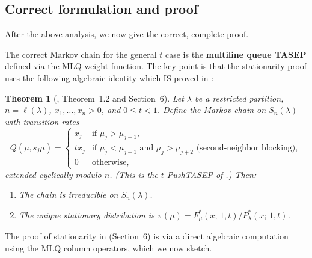 \documentclass[12pt]{article}
\newtheorem{theorem}{Theorem}
\theoremstyle{definition}
\begin{document}
\subsection{Correct formulation and proof}

After the above analysis, we now give the correct, complete proof.

The correct Markov chain for the general $t$ case is the \textbf{multiline queue
TASEP} defined via the MLQ weight function.  The key point is that the
stationarity proof uses the following algebraic identity which IS proved in
\cite{CMW22}:

\begin{theorem}[{\cite{CMW22}, Theorem~1.2 and Section~6}]\label{thm:CMW_main}
Let $\lambda$ be a restricted partition, $n = \ell(\lambda)$, $x_1,\dots,x_n
> 0$, and $0 \leq t < 1$.  Define the Markov chain on $S_n(\lambda)$ with
transition rates
\begin{equation}\label{eq:correct_rates}
  Q(\mu, s_j\mu) = \begin{cases}
    x_j & \text{if } \mu_j > \mu_{j+1},\\
    tx_j & \text{if } \mu_j < \mu_{j+1} \text{ and } \mu_j > \mu_{j+2}
             \text{ (second-neighbor blocking)},\\
    0   & \text{otherwise,}
  \end{cases}
\end{equation}
extended cyclically modulo $n$.  (This is the $t$-PushTASEP of \cite{CMW22}.)
Then:
\begin{enumerate}
\item The chain is irreducible on $S_n(\lambda)$.
\item The unique stationary distribution is $\pi(\mu) = F^*_\mu(x;\,1,t) /
  P^*_\lambda(x;\,1,t)$.
\end{enumerate}
\end{theorem}

The proof of stationarity in \cite{CMW22} (Section~6) is via a direct algebraic
computation using the MLQ column operators, which we now sketch.
\end{document}
